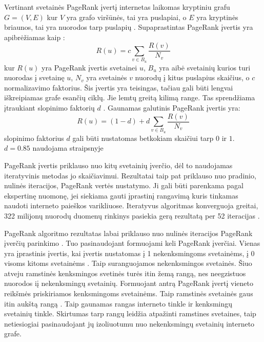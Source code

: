 Vertinant svetainės PageRank įvertį internetas laikomas kryptiniu grafu $G = (V, E)$ kur $V$ yra grafo viršūnės, tai yra puslapiai, o $E$ yra kryptinės briaunos, tai yra nuorodos tarp puslapių \cite{Wu2008}. Supaprastintas PageRank įvertis yra apibrėžiamas kaip \cite{pagerank}:
\begin{equation}
    R(u) = c \sum_{v \in B_u} \frac{R(v)}{N_v}
\end{equation}
kur $R(u)$ yra PageRank įvertis svetainei $u$, $B_u$ yra aibė svetainių kurios turi nuorodas į svetainę $u$, $N_v$ yra svetainės $v$ nuorodų į kitus puslapius skaičius, o $c$ normalizavimo faktorius. Šis įvertis yra teisingas, tačiau gali būti lengvai iškreipiamas grafe esančių ciklų. Jie lemtų greitą kilimą range. Tas sprendžiama įtraukiant slopinimo faktorių $d$ \cite{pagerank}. Gaunamas galutinis PageRank įvertis yra:
\begin{equation}
    R(u) = (1 - d) + d \sum_{v \in B_u} \frac{R(v)}{N_v}
\end{equation}
slopinimo faktorius $d$ gali būti nustatomas betkokiam skaičiui tarp $0$ ir $1$. $d=0.85$ naudojama straipsnyje \cite{pagerank}

 PageRank įvertis priklauso nuo kitų svetainių įverčio, dėl to naudojamas iteratyvinis metodas jo skaičiavimui. Rezultatai taip pat priklauso nuo pradinio, nulinės iteracijos, PageRank vertės nustatymo. Ji gali būti parenkama pagal ekspertinę nuomonę, jei siekiama gauti įprastinį rangavimą kuris tinkamas naudoti interneto paieškos varikliuose.  Iteratyvus algoritmas konverguoja greitai, 322 milijonų nuorodų duomenų rinkinys pasiekia gerą rezultatą per 52 iteracijas \cite{pagerank}.

 PageRank algoritmo rezultatas labai priklauso nuo nulinės iteracijos PageRank įverčių parinkimo \cite{linchpins}. Tuo pasinaudojant formuojami keli PageRank įverčiai. Vienas yra įprastinis įvertis, kai įvertis nustatomas į 1 nekenksmingoms svetainėms, į 0 visoms kitoms svetainėms \cite{linchpins}. Taip suranguojamos nekenksmingos svetainės. Šiuo atveju ramstinės kenksmingos svetinės turės itin žemą rangą, nes neegzistuos nuorodos iį nekenksmingų svetainių. Formuojant antrą PageRank įvertį vieneto reikšmės priskiriamos kenksmingoms svetainėms. Taip ramstinės svetainės gaus itin aukštą rangą \cite{linchpins}. Taip gaunamas rangas interneto tinkle ir kenksmingų svetainių tinkle. Skirtumas tarp rangų leidžia atpažinti ramstines svetaines, taip netiesiogiai pasinaudojant jų izoliuotumu nuo nekenksmingų svetainių interneto grafe.

